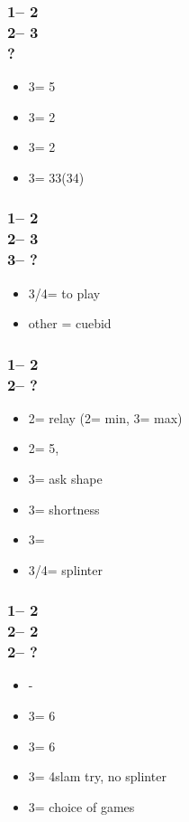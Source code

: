 \documentclass[12pt, a4paper]{article}
\begin{document}
\subsubsection*{1\nt -- 2\clubs\\
                2\diams -- 3\clubs\\
                ?}
\begin{itemize}
    \item 3\diams = 5\minor \qq
    \item 3\hearts = 2\spades
    \item 3\spades = 2\hearts
    \item 3\nt = 33(34)
\end{itemize}

\subsubsection*{1\nt -- 2\clubs\\
                2\diams -- 3\diams\\
                3\major -- ?}
\begin{itemize}
    \item 3\nt/4\major = to play
    \item other = cuebid
\end{itemize}

\subsubsection*{1\nt -- 2\clubs\\
                2\hearts -- ?}
\begin{itemize}
    \item 2\spades = relay (2\nt = min, 3\clubs = max)
    \item 2\nt = 5\spades, \inv
    \item 3\clubs = ask shape
    \item 3\diams = \minor shortness
    \item 3\hearts = \inv
    \item 3\spades/4\minor = splinter
\end{itemize}

\subsubsection*{1\nt -- 2\clubs\\
                2\hearts -- 2\spades\\
                2\nt -- ?}
\begin{itemize}
    \item \pass - \inv\ \bal
    \item 3\clubs = 6\spades \inv
    \item 3\diams = 6\spades \inv
    \item 3\hearts = 4\hearts slam try, no splinter
    \item 3\nt = choice of games
\end{itemize}
\end{document}
